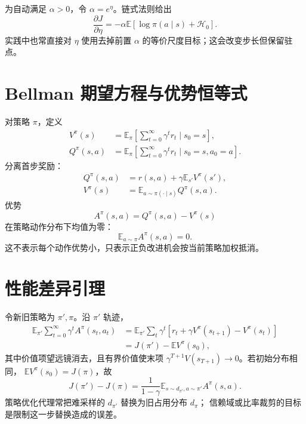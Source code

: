 \documentclass[11pt]{article}
\numberwithin{equation}{section}
\newcommand{\E}{\mathbb{E}}
\newcommand{\1}{\mathbf{1}}
\begin{document}
为自动满足 $\alpha>0$，令 $\alpha=e^\eta$。链式法则给出
\begin{equation}
 \frac{\partial J}{\partial\eta}
 =-\alpha\E[\log\pi(a\mid s)+\mathcal H_0].
\end{equation}
实践中也常直接对 $\eta$ 使用去掉前置 $\alpha$ 的等价尺度目标；这会改变步长但保留驻点。

\section{Bellman 期望方程与优势恒等式}

对策略 $\pi$，定义
\begin{align}
 V^\pi(s)&=\E_\pi\left[\sum_{t=0}^{\infty}\gamma^tr_t\mid s_0=s\right],\\
 Q^\pi(s,a)&=\E_\pi\left[\sum_{t=0}^{\infty}\gamma^tr_t
 \mid s_0=s,a_0=a\right].
\end{align}
分离首步奖励：
\begin{align}
 Q^\pi(s,a)&=r(s,a)+\gamma\E_{s'}V^\pi(s'),\\
 V^\pi(s)&=\E_{a\sim\pi(\cdot\mid s)}Q^\pi(s,a).
\end{align}
优势
\begin{equation}
 A^\pi(s,a)=Q^\pi(s,a)-V^\pi(s)
\end{equation}
在策略动作分布下均值为零：
\begin{equation}
 \E_{a\sim\pi}A^\pi(s,a)=0.
\end{equation}
这不表示每个动作优势小，只表示正负改进机会按当前策略加权抵消。

\section{性能差异引理}

令新旧策略为 $\pi',\pi$。沿 $\pi'$ 轨迹，
\begin{align}
 \E_{\pi'}\sum_{t=0}^{\infty}\gamma^tA^\pi(s_t,a_t)
 &=\E_{\pi'}\sum_t\gamma^t
 [r_t+\gamma V^\pi(s_{t+1})-V^\pi(s_t)]\\
 &=J(\pi')-\E V^\pi(s_0),
\end{align}
其中价值项望远镜消去，且有界价值使末项
$\gamma^{T+1}V(s_{T+1})\to0$。若初始分布相同，
$\E V^\pi(s_0)=J(\pi)$，故
\begin{equation}
 \boxed{J(\pi')-J(\pi)
 =\frac1{1-\gamma}
 \E_{s\sim d_{\pi'},a\sim\pi'}A^\pi(s,a).}
\end{equation}
策略优化代理常把难采样的 $d_{\pi'}$ 替换为旧占用分布 $d_\pi$；
信赖域或比率裁剪的目标是限制这一步替换造成的误差。
\end{document}
